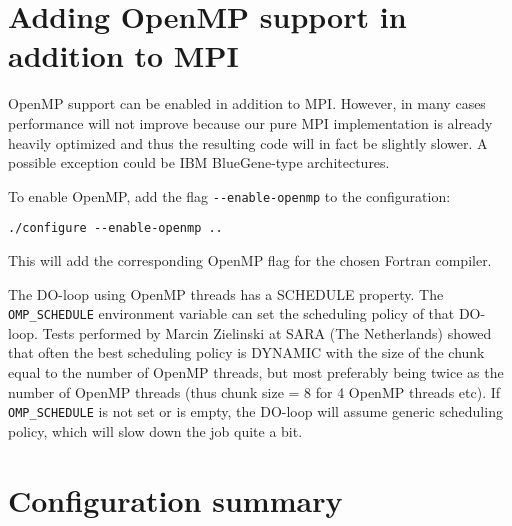 \section{Adding OpenMP support in addition to MPI}

OpenMP support can be enabled in addition to MPI. However, in many
cases performance will not improve because our pure MPI implementation
is already heavily optimized and thus the resulting code will in fact
be slightly slower. A possible exception could be IBM BlueGene-type
architectures.\newline

\noindent
To enable OpenMP,  add the flag \texttt{-{}-enable-openmp} to the configuration:
\begin{verbatim}
./configure --enable-openmp ..
\end{verbatim}
This will add the corresponding OpenMP flag for the chosen Fortran compiler.\newline


The DO-loop using OpenMP threads has a SCHEDULE property. The \texttt{OMP\_SCHEDULE}
environment variable can set the scheduling policy of that DO-loop.
Tests performed by Marcin Zielinski at SARA (The Netherlands) showed
that often the best scheduling policy is DYNAMIC with the size of
the chunk equal to the number of OpenMP threads, but most preferably
being twice as the number of OpenMP threads (thus chunk size = 8 for
4 OpenMP threads etc). If \texttt{OMP\_SCHEDULE} is not set or is empty, the
DO-loop will assume generic scheduling policy, which will slow down
the job quite a bit.


\section{Configuration summary}

